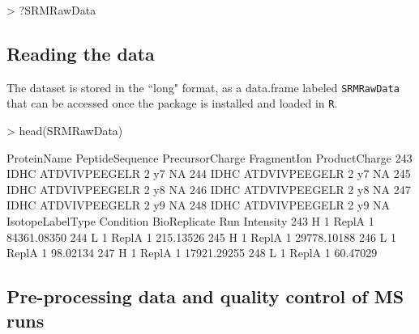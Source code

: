 \documentclass[11pt]{article}
\begin{document}
\begin{small}
\begin{Schunk}
\begin{Sinput}
> ?SRMRawData
\end{Sinput}
\end{Schunk}
\end{small}

\subsection{Reading the data}
The dataset is stored in the ``long" format, as a data.frame labeled {\tt SRMRawData} that can be accessed once the package is installed and loaded in {\tt R}. 

\begin{small}
\begin{Schunk}
\begin{Sinput}
> head(SRMRawData)
\end{Sinput}
\begin{Soutput}
    ProteinName PeptideSequence PrecursorCharge FragmentIon ProductCharge
243        IDHC   ATDVIVPEEGELR               2          y7            NA
244        IDHC   ATDVIVPEEGELR               2          y7            NA
245        IDHC   ATDVIVPEEGELR               2          y8            NA
246        IDHC   ATDVIVPEEGELR               2          y8            NA
247        IDHC   ATDVIVPEEGELR               2          y9            NA
248        IDHC   ATDVIVPEEGELR               2          y9            NA
    IsotopeLabelType Condition BioReplicate Run   Intensity
243                H         1        ReplA   1 84361.08350
244                L         1        ReplA   1   215.13526
245                H         1        ReplA   1 29778.10188
246                L         1        ReplA   1    98.02134
247                H         1        ReplA   1 17921.29255
248                L         1        ReplA   1    60.47029
\end{Soutput}
\end{Schunk}
\end{small}


\subsection{Pre-processing data and quality control of MS runs \label{sec:SRMprocess}}
\end{document}
